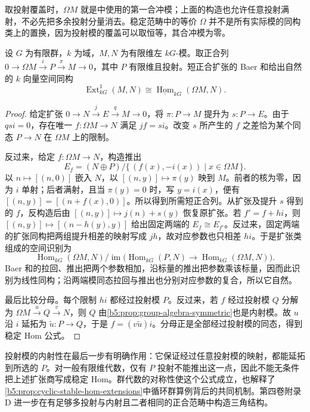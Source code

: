 取投射覆盖时，\(\Omega M\) 就是中使用的第一合冲模；上面的构造也允许任意投射满射，不必先把多余投射分量消去。稳定范畴中的等价 \(\Omega\) 并不是所有实际模的同构类上的置换，因为投射模的覆盖可以取恒等，其合冲模为零。

\begin{proposition}\label{b5:prop:stable-hom-ext}
	设 \(G\) 为有限群，\(k\) 为域，\(M,N\) 为有限维左 \(kG\)-模。取正合列 \(0\to\Omega M\xrightarrow{i}P\xrightarrow{\pi}M\to0\)，其中 \(P\) 有限维且投射。短正合扩张的 Baer 和给出自然的 \(k\) 向量空间同构
	\[
		\operatorname{Ext}_{kG}^1(M,N)
		\cong\underline{\operatorname{Hom}}_{kG}(\Omega M,N).
	\]
\end{proposition}
\begin{proof}
	给定扩张 \(0\to N\xrightarrow{j}E\xrightarrow{q}M\to0\)，将 \(\pi:P\to M\) 提升为 \(s:P\to E\)。由于 \(qsi=0\)，存在唯一 \(f:\Omega M\to N\) 满足 \(jf=si\)。改变 \(s\) 所产生的 \(f\) 之差恰为某个同态 \(P\to N\) 在 \(\Omega M\) 上的限制。

	反过来，给定 \(f:\Omega M\to N\)，构造推出
	\[
		E_f=(N\oplus P)/\{\,(f(x),-i(x))\mid x\in\Omega M\,\}.
	\]
	以 \(n\mapsto[(n,0)]\) 嵌入 \(N\)，以 \([(n,y)]\mapsto\pi(y)\) 映到 \(M\)。前者的核为零，因为 \(i\) 单射；后者满射，且当 \(\pi(y)=0\) 时，写 \(y=i(x)\)，便有 \([(n,y)]=[(n+f(x),0)]\)。所以得到所需短正合列。从扩张及提升 \(s\) 得到的 \(f\)，反构造后由 \([(n,y)]\mapsto j(n)+s(y)\) 恢复原扩张。若 \(f'=f+hi\)，则 \([(n,y)]\mapsto[(n-h(y),y)]\) 给出固定两端的 \(E_f\cong E_{f'}\)。反过来，固定两端的扩张同构把两组提升相差的映射写成 \(jh\)，故对应参数也只相差 \(hi\)。于是扩张类组成的空间识别为
	\[
		\operatorname{Hom}_{kG}(\Omega M,N)
		\big/\operatorname{im}\bigl(\operatorname{Hom}_{kG}(P,N)\to\operatorname{Hom}_{kG}(\Omega M,N)\bigr).
	\]
	Baer 和的拉回、推出把两个参数相加，沿标量的推出把参数乘该标量，因而此识别为线性同构；沿两端模同态拉回与推出也分别对应参数的复合，所以它自然。

	最后比较分母。每个限制 \(hi\) 都经过投射模 \(P\)。反过来，若 \(f\) 经过投射模 \(Q\) 分解为 \(\Omega M\xrightarrow{u}Q\xrightarrow{v}N\)，则 \(Q\) 由\cref{b5:prop:group-algebra-symmetric}也是内射模。故 \(u\) 沿 \(i\) 延拓为 \(\widetilde u:P\to Q\)，于是 \(f=(v\widetilde u)i\)。分母正是全部经过投射模的同态，得到稳定 Hom 公式。
\end{proof}

投射模的内射性在最后一步有明确作用：它保证经过任意投射模的映射，都能延拓到所选的 \(P\)。对一般有限维代数，仅有 \(P\) 投射不能推出这一点，因此不能无条件把上述扩张商写成稳定 Hom。群代数的对称性使这个公式成立，也解释了\cref{b5:prop:cyclic-stable-hom-extensions}中循环群算例背后的共同机制。第四卷附录 D 进一步在有足够多投射与内射且二者相同的正合范畴中构造三角结构。

